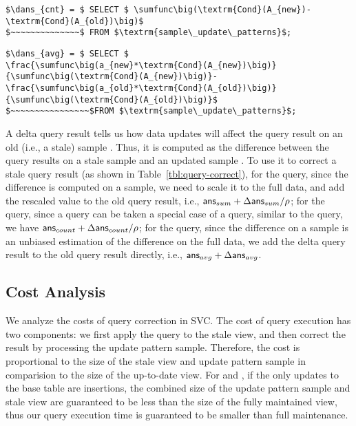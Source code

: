 \begin{lstlisting}[mathescape,basicstyle={\scriptsize}]
$\dans_{cnt} = $ SELECT $ \sumfunc\big(\textrm{Cond}(A_{new})-\textrm{Cond}(A_{old})\big)$ 
$~~~~~~~~~~~~~~$ FROM $\textrm{sample\_update\_patterns}$;
\end{lstlisting}


\begin{lstlisting}[mathescape,basicstyle={\scriptsize}]
$\dans_{avg} = $ SELECT $
\frac{\sumfunc\big(a_{new}*\textrm{Cond}(A_{new})\big)}{\sumfunc\big(\textrm{Cond}(A_{new})\big)}- \frac{\sumfunc\big(a_{old}*\textrm{Cond}(A_{old})\big)}{\sumfunc\big(\textrm{Cond}(A_{old})\big)}$ 
$~~~~~~~~~~~~~~~~$FROM $\textrm{sample\_update\_patterns}$;
\end{lstlisting}

A delta query result tells us how data updates will affect the query result on an old (i.e., a stale) sample \aggview. Thus, it is computed as the difference between the query results on a stale sample \aggview and an updated sample \aggview. To use it to correct a stale query result (as shown in Table~\ref{tbl:query-correct}), for the \sumfunc query, since the \sumfunc difference is computed on a sample, we need to scale it to the full data, and add the rescaled value to the old query result, i.e., $\textsf{ans}_{sum}+\Delta\textsf{ans}_{sum}/\rho $; for the \countfunc query, since a \countfunc query can be taken a special case of a \sumfunc query, similar to the \sumfunc query, we have $\textsf{ans}_{count}+\Delta\textsf{ans}_{count}/\rho $; for the \avgfunc query, since the \avgfunc difference on a sample is an unbiased estimation of the \avgfunc difference on the full data, we add the delta query result to the old query result directly, i.e., $\textsf{ans}_{avg}+\Delta\textsf{ans}_{avg}$.


\subsection{Cost Analysis}\label{subsec-corr-cost}
We analyze the costs of query correction in SVC.
The cost of query execution has two components: we first apply the query to the stale view, and then correct the result by processing the update pattern sample.
Therefore, the cost is proportional to the size of the stale view and update pattern sample in comparision to the size of the up-to-date view.
For \fjview and \spview, if the only updates to the base table are insertions, the combined size of the update pattern sample and stale view are guaranteed to be less than the size of the fully maintained view, thus our query execution time is guaranteed to be smaller than full maintenance.

